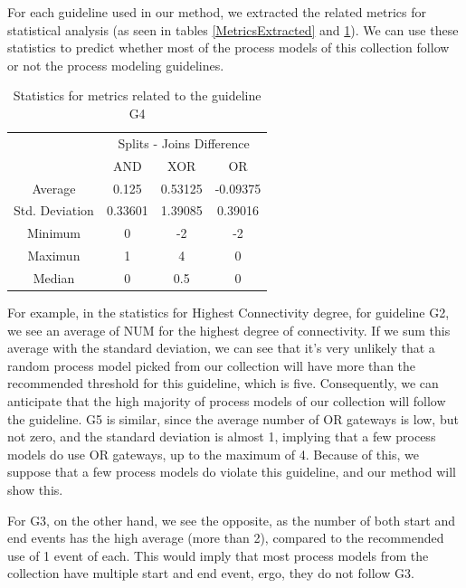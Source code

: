 \documentclass[a4paper,twoside]{article}
\begin{document}
For each guideline used in our method, we extracted the related metrics for statistical analysis (as seen in tables \ref{MetricsExtracted} and \ref{MetricsGateways}). We can use these statistics to predict whether most of the process models of this collection follow or not the process modeling guidelines. 



\begin{table}[]
	\centering
	\caption{Statistics for metrics related to the guideline G4}
	\label{MetricsGateways}
	\begin{tabular}{|c|c|c|c|}
		\hline
		\multirow{2}{*}{}  & \multicolumn{3}{c|}{Splits - Joins Difference} \\ \cline{2-4} 
		& AND            & XOR           & OR            \\ \hline
		Average            & 0.125          & 0.53125       & -0.09375      \\ \hline
		Std. Deviation & 0.33601   & 1.39085   & 0.39016   \\ \hline
		Minimum            & 0              & -2            & -2            \\ \hline
		Maximun            & 1              & 4             & 0             \\ \hline
		Median             & 0              & 0.5           & 0             \\ \hline
	\end{tabular}
\end{table}

For example, in the statistics for Highest Connectivity degree, for guideline G2, we see an average of NUM for the highest degree of connectivity. If we sum this average with the standard deviation, we can see that it's very unlikely that a random process model picked from our collection will have more than the recommended threshold for this guideline, which is five. Consequently, we can anticipate that the high majority of process models of our collection will follow the guideline. G5 is similar, since the average number of OR gateways is low, but not zero, and the standard deviation is almost 1, implying that a few process models do use OR gateways, up to the maximum of 4. Because of this, we suppose that a few process models do violate this guideline, and our method will show this.

For G3, on the other hand, we see the opposite, as the number of both start and end events has the high average (more than 2), compared to the recommended use of 1 event of each. This would imply that most process models from the collection have multiple start and end event, ergo, they do not follow G3. 
\end{document}
